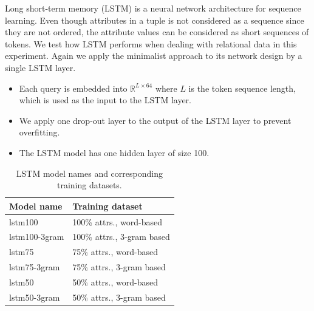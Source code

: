 \documentclass[conference]{IEEEtran}
\begin{document}
Long short-term memory (LSTM) is a neural network architecture for sequence learning. Even though attributes in a tuple is not considered as a sequence since they are not ordered, the attribute values can be considered as short sequences of tokens. We test how LSTM performs when dealing with relational data in this experiment. Again we apply the minimalist approach to its network design by a single LSTM layer.


\begin{itemize}
	\item Each query is embedded into $\mathbb{R}^{L\times 64}$ where $L$ is the token sequence length, which is used as the input to the LSTM layer.
	\item We apply one drop-out layer to the output of the LSTM layer to prevent overfitting.
	\item The LSTM model has one hidden layer of size 100.
\end{itemize}

\begin{table}[!th]
	\centering
	\begin{tabularx}{0.8\textwidth}{|l|X|}
		\hline
		\textbf{Model name} & \textbf{Training dataset} \\ \hline
		lstm100 & 100\% attrs., word-based \\
		lstm100-3gram & 100\% attrs., 3-gram based \\ 
		lstm75 & 75\% attrs., word-based \\
		lstm75-3gram & 75\% attrs., 3-gram based \\ 
		lstm50 & 50\% attrs., word-based \\
		lstm50-3gram & 50\% attrs., 3-gram based \\ 
		\hline
	\end{tabularx}
	\caption{LSTM model names and corresponding training datasets.}
	\label{tab:trained_lstm_models}
\end{table}

\end{document}
